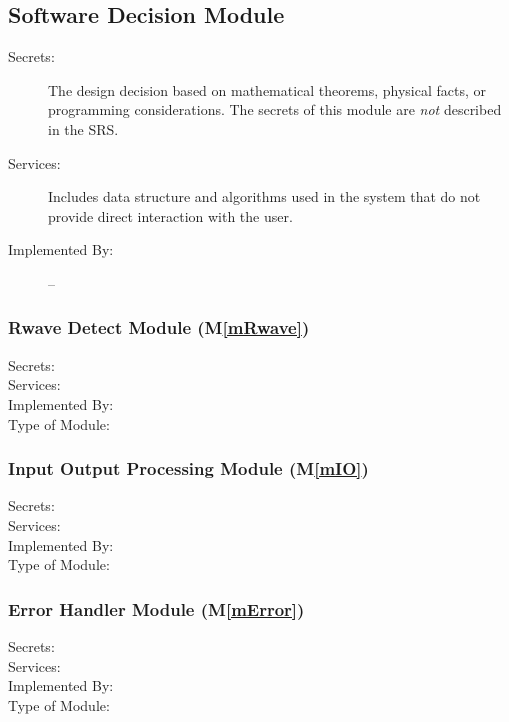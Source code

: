 \documentclass[12pt, titlepage]{article}
\newcommand{\mref}[1]{M\ref{#1}}
\begin{document}
\subsection{Software Decision Module}

\begin{description}
\item[Secrets:] The design decision based on mathematical theorems, physical
  facts, or programming considerations. The secrets of this module are
  \emph{not} described in the SRS.
\item[Services:] Includes data structure and algorithms used in the system that
  do not provide direct interaction with the user. 
\item[Implemented By:] --
\end{description}

\subsubsection{Rwave Detect Module (\mref{mRwave})}

\begin{description}
\item[Secrets:]
\item[Services:]
\item[Implemented By:] \progname
\item[Type of Module:]
\end{description}

\subsubsection{Input Output Processing Module (\mref{mIO})}

\begin{description}
\item[Secrets:]
\item[Services:]
\item[Implemented By:] \progname
\item[Type of Module:]
\end{description}

\subsubsection{Error Handler Module (\mref{mError})}

\begin{description}
\item[Secrets:]
\item[Services:]
\item[Implemented By:] \progname
\item[Type of Module:]
\end{description}
\end{document}
